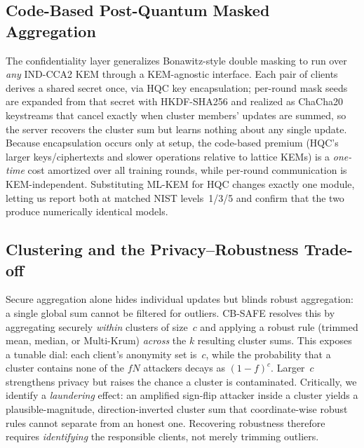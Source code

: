 \documentclass[conference]{IEEEtran}
\begin{document}
\subsection{Code-Based Post-Quantum Masked Aggregation}
The confidentiality layer generalizes Bonawitz-style double masking
\cite{bonawitz2017} to run over \emph{any} IND-CCA2 KEM through a KEM-agnostic
interface. Each pair of clients derives a shared secret once, via HQC key
encapsulation; per-round mask seeds are expanded from that secret with HKDF-SHA256 and
realized as ChaCha20 keystreams that cancel exactly when cluster members' updates are
summed, so the server recovers the cluster sum but learns nothing about any single
update. Because encapsulation occurs only at setup, the code-based premium (HQC's
larger keys/ciphertexts and slower operations relative to lattice KEMs) is a
\emph{one-time} cost amortized over all training rounds, while per-round communication
is KEM-independent. Substituting ML-KEM for HQC changes exactly one module, letting us
report both at matched NIST levels~1/3/5 and confirm that the two produce numerically
identical models.

\subsection{Clustering and the Privacy--Robustness Trade-off}
Secure aggregation alone hides individual updates but blinds robust aggregation: a
single global sum cannot be filtered for outliers. CB-SAFE resolves this by
aggregating securely \emph{within} clusters of size~$c$ and applying a robust rule
(trimmed mean, median, or Multi-Krum) \emph{across} the $k$ resulting cluster sums.
This exposes a tunable dial: each client's anonymity set is~$c$, while the probability
that a cluster contains none of the $fN$ attackers decays as $(1-f)^c$. Larger~$c$
strengthens privacy but raises the chance a cluster is contaminated. Critically, we
identify a \emph{laundering} effect: an amplified sign-flip attacker inside a cluster
yields a plausible-magnitude, direction-inverted cluster sum that coordinate-wise
robust rules cannot separate from an honest one. Recovering robustness therefore
requires \emph{identifying} the responsible clients, not merely trimming outliers.
\end{document}
